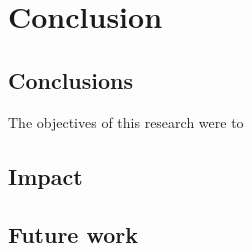 \chapter{Conclusion} \label{chap:conclusion}

\section{Conclusions} \label{conclusion:sec:conclusions}
The objectives of this research were to 



\section{Impact} \label{conclusion:sec:impact}



\section{Future work} \label{conclusion:sec:future}
